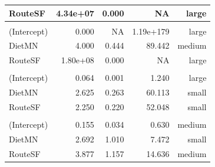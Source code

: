 \documentclass[
  12pt,
  letterpaper,
]{article}
\begin{document}
\begin{longtable}{l|rrrr}
RouteSF & 4.34e+07 & 0.000 & NA & large \\ 
\midrule\addlinespace[2.5pt]
\multicolumn{5}{l}{Liver} \\[2.5pt] 
\midrule\addlinespace[2.5pt]
(Intercept) &         0.000 & NA & 1.19e+179 & large \\ 
DietMN &         4.000 & 0.444 &                                                                                                                                                                                   89.442 & medium \\ 
RouteSF & 1.80e+08 & 0.000 & NA & large \\ 
\midrule\addlinespace[2.5pt]
\multicolumn{5}{l}{Paw} \\[2.5pt] 
\midrule\addlinespace[2.5pt]
(Intercept) &         0.064 & 0.001 &                                                                                                                                                                                    1.240 & large \\ 
DietMN &         2.625 & 0.263 &                                                                                                                                                                                   60.113 & small \\ 
RouteSF &         2.250 & 0.220 &                                                                                                                                                                                   52.048 & small \\ 
\midrule\addlinespace[2.5pt]
\multicolumn{5}{l}{Spleen} \\[2.5pt] 
\midrule\addlinespace[2.5pt]
(Intercept) &         0.155 & 0.034 &                                                                                                                                                                                    0.630 & medium \\ 
DietMN &         2.692 & 1.010 &                                                                                                                                                                                    7.472 & small \\ 
RouteSF &         3.877 & 1.157 &                                                                                                                                                                                   14.636 & medium \\ 
\bottomrule
\end{longtable}
\endgroup
\end{document}
